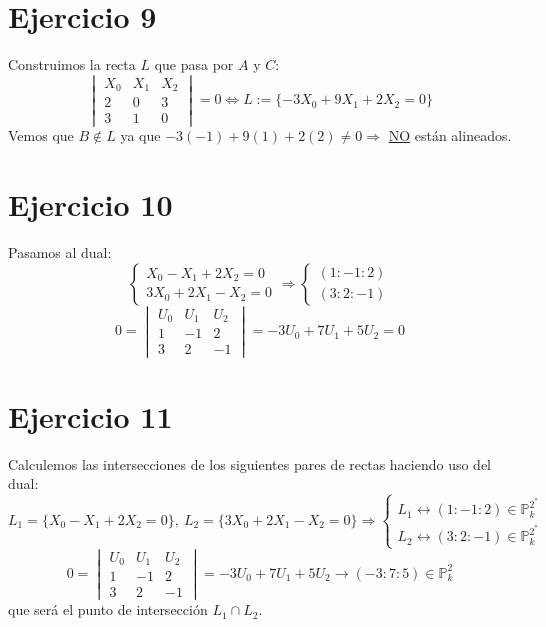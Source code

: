 \documentclass[10pt,a4paper,openright]{book}
\theoremstyle{break}
\begin{document}
\section{Ejercicio 9}%
\label{sec:ejercicio_9}
Construimos la recta $L$ que pasa por $A$ y $C$:
\[
    \begin{vmatrix} X_0 & X_1 & X_2\\2 & 0 & 3\\ 3 & 1 & 0 \end{vmatrix} = 0 \Leftrightarrow L := \{-3X_0 + 9X_1 + 2X_2 = 0\} 
\]
Vemos que $B \not\in L$ ya que $-3\left( -1 \right) + 9\left( 1 \right) + 2\left( 2 \right) \neq 0 \Rightarrow$ \underline{NO} están alineados.

\section{Ejercicio 10}%
\label{sec:ejercicio_10}
Pasamos al dual:
\[
\begin{cases}
    X_0 - X_1 + 2X_2 = 0\\
    3X_0 + 2X_1 - X_2 = 0
\end{cases} \Rightarrow \begin{cases}
    \left( 1 : -1 : 2 \right)\\
    \left( 3 : 2 : -1 \right) 
\end{cases}  
\]\[
0 = \begin{vmatrix} U_0 & U_1 & U_2\\ 1 & -1 & 2\\ 3 & 2 & -1 \end{vmatrix} = \boxed{-3U_0 + 7U_1 + 5 U_2 = 0} 
\]

\section{Ejercicio 11}%
\label{sec:ejercicio_11}
Calculemos las intersecciones de los siguientes pares de rectas haciendo uso del dual:
\[
L_1 = \{X_0 - X_1 + 2X_2 = 0\},\ L_2 = \{3X_0 + 2X_1 - X_2 = 0\} \Rightarrow
\begin{cases}    
L_1 \leftrightarrow \left( 1 : -1 : 2 \right) \in \mathbb{P}^{2^*}_{k}\\
L_2 \leftrightarrow \left( 3 : 2: -1 \right) \in \mathbb{P}^{2^*}_{k} 
\end{cases} 
\]\[
0 = \begin{vmatrix} U_0 & U_1 & U_2\\ 1 & -1 & 2\\ 3 & 2 & -1 \end{vmatrix} = -3U_0 + 7U_1 + 5U_2 \rightarrow \left( -3 : 7 : 5 \right) \in \mathbb{P}^{2}_{k} 
\]
que será el punto de intersección $L_1 \cap L_2$.
\end{document}
